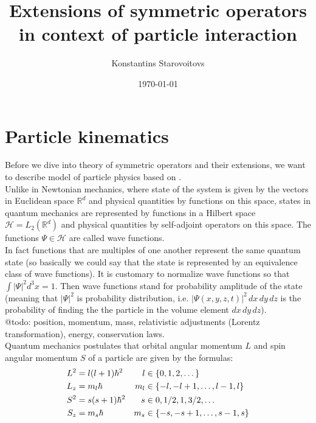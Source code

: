 \documentclass[11pt, a4paper, german]{article}
\author{Konstantins Starovoitovs}
\date{\today}
\title{Extensions of symmetric operators in context of particle interaction}
\numberwithin{equation}{section}
\numberwithin{theorem}{section}
\begin{document}
\maketitle


\section{Particle kinematics}

Before we dive into theory of symmetric operators and their extensions, we want to describe model of particle physics based on \cite{griffiths}.\\

Unlike in Newtonian mechanics, where state of the system is given by the vectors in Euclidean space $\mathbb{R} ^d$ and physical quantities by functions on this space, states in quantum mechanics are represented by functions in a Hilbert space $\mathcal{H} = L_2(\mathbb{R} ^d)$ and physical quantities by self-adjoint operators on this space. The functions $\Psi \in \mathcal{H}$ are called wave functions.\\

In fact functions that are multiples of one another represent the same quantum state (so basically we could say that the state is represented by an equivalence class of wave functions). It is customary to normalize wave functions so that $\int |\Psi|^2 d^3x=1$. Then wave functions stand for probability amplitude of the state (meaning that $|\Psi |^2$ is probability distribution, i.e. $|\Psi(x,y,z,t)|^2 \, dx \, dy\,dz$ is the probability of finding the the particle in the volume element $dx\,dy\,dz$).\\

@todo: position, momentum, mass, relativistic adjustments (Lorentz transformation), energy, conservation laws.\\

Quantum mechanics postulates that orbital angular momentum $L$ and spin angular momentum $S$ of a particle are given by the formulas:
\begin{align}
L^2 &= l(l+1)\hbar^2 &l   &\in \mathbb \{0, 1, 2, \dots\} \label{eq:l2} \\
L_z &= m_l\hbar      &m_l &\in \{-l, -l+1, \dots, l-1, l\} \label{eq:lz}\\
S^2 &= s(s+1)\hbar^2 &s   &\in {0, 1/2, 1, 3/2, \dots} \label{eq:s2}\\
S_z &= m_s\hbar      &m_s &\in \{-s, -s+1, \dots, s-1, s\} \label{eq:sz}
\end{align}
\end{document}
